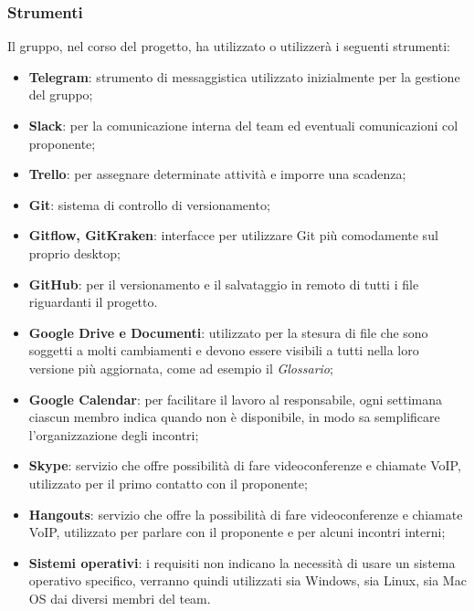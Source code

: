 		\subsubsection{Strumenti}
		Il gruppo, nel corso del progetto, ha utilizzato o utilizzerà i seguenti strumenti:
		\begin{itemize}
			\item \textbf{Telegram}: strumento di messaggistica utilizzato inizialmente per la gestione del gruppo;
			\item \textbf{Slack}: per la comunicazione interna del team ed eventuali comunicazioni col proponente;
			\item \textbf{Trello}: per assegnare determinate attività e imporre una scadenza;
			\item \textbf{Git}: sistema di controllo di versionamento;
			\item \textbf{Gitflow, GitKraken}: interfacce per utilizzare Git più comodamente sul proprio desktop;
			\item \textbf{GitHub}: per il versionamento e il salvataggio in remoto di tutti i file riguardanti il progetto.
			\item \textbf{Google Drive e Documenti}: utilizzato per la stesura di file che sono soggetti a molti cambiamenti e devono essere visibili a tutti nella loro versione più aggiornata, come ad esempio il \textit{Glossario};
			\item \textbf{Google Calendar}: per facilitare il lavoro al responsabile, ogni settimana ciascun membro indica quando non è disponibile, in modo sa semplificare l'organizzazione degli incontri;
			\item \textbf{Skype}: servizio che offre possibilità di fare videoconferenze e chiamate VoIP, utilizzato per il primo contatto con il proponente;
			\item \textbf{Hangouts}: servizio che offre la possibilità di fare videoconferenze e chiamate VoIP, utilizzato per parlare con il proponente e per alcuni incontri interni;
			\item \textbf{Sistemi operativi}: i requisiti non indicano la necessità di usare un sistema operativo specifico, verranno quindi utilizzati sia Windows, sia Linux, sia Mac OS dai diversi membri del team. %
		\end{itemize}
	